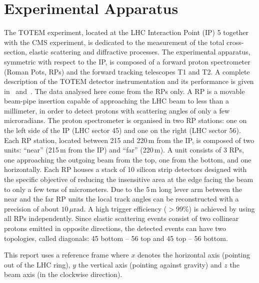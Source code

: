 \section{Experimental Apparatus}
\label{sec:exp apparatus}

The TOTEM experiment, located at the LHC Interaction Point (IP) 5 together with
the CMS experiment, is dedicated to the measurement of the total 
cross-section, elastic scattering
and diffractive processes. The experimental
apparatus, symmetric with respect to the IP, is 
composed of a forward proton spectrometer (Roman Pots, RPs) and the 
forward tracking telescopes T1 and T2. 
A complete description of the TOTEM detector instrumentation 
and its performance is given in~\cite{totem-jinst} and~\cite{totem-ijmp}. 
The data analysed here come from the RPs only. A RP is a movable beam-pipe
insertion capable of approaching the LHC beam to less than a millimeter, in 
order to detect protons with scattering angles of only a few microradians. 
The proton spectrometer is organised in two RP stations: one on the left side of the IP 
(LHC sector 45) and one on the right (LHC sector 56).
Each RP station, located between 215 and 220\,m from the IP, is composed of two 
units: ``near'' (215\,m from the IP) and ``far'' (220\,m). 
A unit consists of 3 RPs, one
approaching the outgoing beam from the top, one from the bottom, and one 
horizontally.
Each RP houses a stack of 10 silicon
strip detectors designed with the specific objective of
reducing the insensitive area at the edge facing the beam
to only a few tens of micrometers. Due to the 5\,m long lever arm 
between the near and the far RP units 
the local track angles can be reconstructed
with a precision of about $10\,\mu$rad. A high trigger efficiency
($> 99$\%) is achieved by using all RPs independently. 
Since elastic scattering events consist of two collinear protons emitted in 
opposite directions, the detected events can have two topologies, called 
diagonals: 45 bottom -- 56 top and 45 top -- 56 bottom.

This report uses a reference frame where $x$ denotes the horizontal axis (pointing out of the LHC ring), $y$ the vertical axis (pointing against gravity) and $z$ the beam axis (in the clockwise direction).
